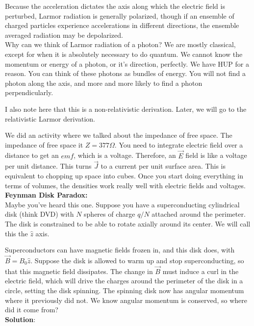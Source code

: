 \documentclass{article}
\begin{document}
Because the acceleration dictates the axis along which the electric field is perturbed, Larmor radiation
is generally polarized, though if an ensemble of charged particles experience accelerations in different
directions, the ensemble averaged radiation may be depolarized.\\


Why can we think of Larmor radiation of a photon? We are mostly classical, except for when it is absolutely necessary to do quantum. We cannot know the momentum or energy of a photon, or it's direction, perfectly. We have HUP for a reason. You can think of these photons as bundles of energy. You will not find a photon along the axis, and more and more likely to find a photon perpendicularly. 

I also note here that this is a non-relativistic derivation. Later, we will go to the relativistic Larmor derivation. 

We did an activity where we talked about the impedance of free space. The impedance of free space it $Z = 377 \Omega$. You need to integrate electric field over a distance to get an $emf$, which is a voltage. Therefore, an $\vec{E}$ field is like a voltage per unit distance. This turns $\vec{J}$ to a current per unit surface area. This is equivalent to chopping up space into cubes. Once you start doing everything in terms of volumes, the densities work really well with electric fields and voltages. \\

\textbf{Feynman Disk Paradox:}\\

Maybe you've heard this one.  Suppose you have a superconducting cylindrical 
disk (think DVD) with $N$ spheres of charge $q/N$ attached around the perimeter.
The disk is constrained to be able to rotate axially around its center.  We
will call this the $\hat z$ axis.

Superconductors can have magnetic fields frozen in, and this disk does, with
$\vec B=B_0\hat z$.  Suppose the disk is allowed to warm up and stop 
superconducting, so that this magnetic field dissipates.  The change in $\vec B$
must induce a curl in the electric field, which will drive the charges
around the perimeter of the disk in a circle, setting the disk spinning.
The spinning disk now has angular momentum where it previously did not.  We
know angular momentum is conserved, so where did it come from?\\

\textbf{Solution}:\\
\end{document}
